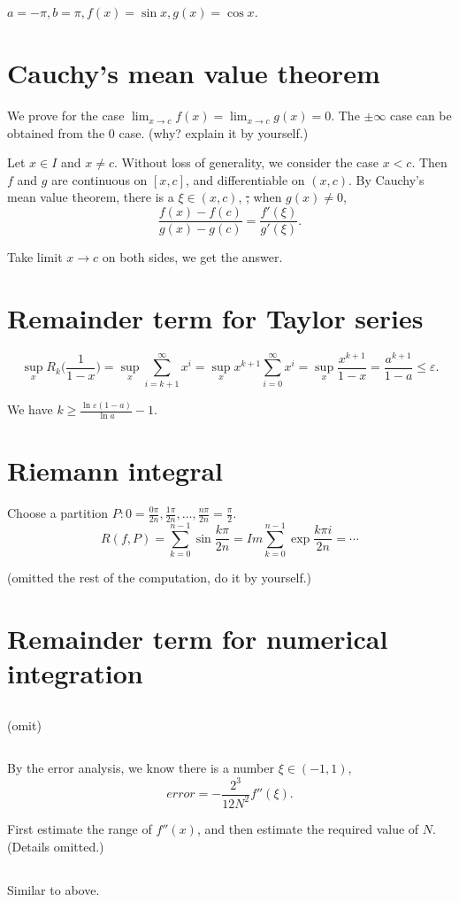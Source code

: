 \subsection{} %

\(a=-\pi, b=\pi, f(x) = \sin x, g(x) = \cos x \).

\section{Cauchy's mean value theorem} %

We prove for the case \(\lim_{x\to c}f(x)=\lim_{x\to c}g(x)=0\). The \(\pm\infty \) case can be obtained from the 0 case. (why? explain it by yourself.)

Let \(x\in I\) and \(x\ne c\). Without loss of generality, we consider the case \(x<c\).
Then \(f\) and \(g\) are continuous on \([x, c]\), and differentiable on \((x, c)\).
By Cauchy's mean value theorem, there is a \(\xi\in(x, c)\), \st, when \(g(x)\ne0\),
\[\frac{f(x)-f(c)}{g(x)-g(c)}=\frac{f'(\xi)}{g'(\xi)}.\]

Take limit \(x\to c\) on both sides, we get the answer.

\section{Remainder term for Taylor series} %

\[\sup_x R_k\bigg(\frac{1}{1-x}\bigg) =\sup_x  \sum_{i=k+1}^\infty x^i=\sup_x x^{k+1}\sum_{i=0}^\infty x^i=\sup_x \frac{x^{k+1}}{1-x}=\frac{a^{k+1}}{1-a}\le\varepsilon.\]

We have \(k\ge \frac{\ln \varepsilon(1-a)}{\ln a}-1\).

\section{Riemann integral} %

Choose a partition \(P: 0 = \frac{0\pi}{2n}, \frac{1\pi}{2n}, \dots, \frac{n\pi}{2n}=\frac{\pi}{2}\).
\[R(f, P) = \sum_{k=0}^{n-1}\sin \frac{k\pi}{2n} = Im\sum_{k=0}^{n-1}\exp \frac{k\pi i}{2n} = \cdots \]

(omitted the rest of the computation, do it by yourself.)

\section{Remainder term for numerical integration} %

\subsection{} %

(omit)

\subsection{} %

By the error analysis, we know there is a number \(\xi\in(-1, 1)\),
\[error = -\frac{2^3}{12N^2}f''(\xi).\]

First estimate the range of \(f''(x)\), and then estimate the required value of \(N\).
(Details omitted.)

\subsection{} %

Similar to above.
